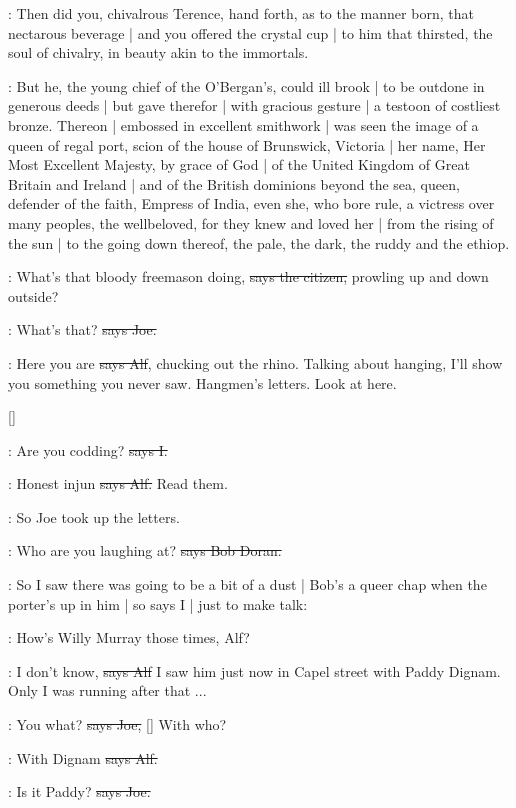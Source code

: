 :
Then did you,
chivalrous Terence,
hand forth,
as to the manner born,
that nectarous beverage |
and you offered the crystal cup |
to him that thirsted,
the soul of chivalry,
in beauty akin to the immortals.

:
But he,
the young chief of the O'Bergan's,
could ill brook |
to be outdone in generous deeds |
but gave therefor |
with gracious gesture |
a testoon of costliest bronze.
Thereon |
embossed in excellent smithwork |
was seen the image of a queen of regal port,
scion of the house of Brunswick,
Victoria |
her name,
Her Most Excellent Majesty,
by grace of God |
of the United Kingdom of Great Britain and Ireland |
and of the British dominions beyond the sea,
queen,
defender of the faith,
Empress of India,
even she,
who bore rule,
a victress over many peoples,
the wellbeloved,
for they knew and loved her |
from the rising of the sun |
to the going down thereof,
the pale,
the dark,
the ruddy and the ethiop.

\citizen:
What's that bloody freemason doing,
\sout{says the citizen,}
prowling up and down outside?

\joe:
What's that?
\sout{says Joe.}

\bergan:
Here you are
\sout{says Alf},
chucking out the rhino.
Talking about hanging,
I'll show you something you never saw.
Hangmen's letters.
Look at here.

[]

:
Are you codding?
\sout{says I.}

\bergan:
Honest injun
\sout{says Alf.}
Read them.

\Nq:
So Joe took up the letters.

\doran:
Who are you laughing at?
\sout{says Bob Doran.}

\Nq:
So I saw there was going to be a bit of a dust |
Bob's a queer chap when the porter's up in him |
so says I |
just to make talk:

:
How's Willy Murray those times,
Alf?

\bergan:
I don't know,
\sout{says Alf}
I saw him just now in Capel street with Paddy Dignam.
Only I was running after that ...

\joe:
You what?
\sout{says Joe,}
[]
With who?

\bergan:
With Dignam
\sout{says Alf.}

\joe:
Is it Paddy?
\sout{says Joe.}

